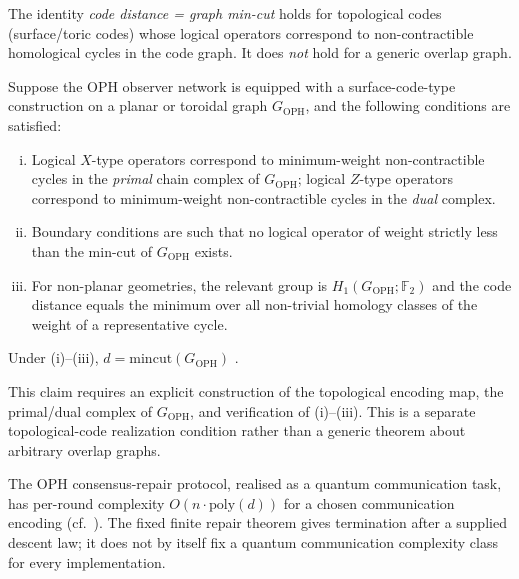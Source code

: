 \begin{claim}
\label{claim:qecc-mincut}
The identity \emph{code distance = graph min-cut} holds for topological
codes (surface/toric codes) whose logical operators correspond to
non-contractible homological cycles in the code graph.
It does \emph{not} hold for a generic overlap graph.

Suppose the OPH observer network is equipped with a surface-code-type
construction on a planar or toroidal graph $G_{\mathrm{OPH}}$, and the
following conditions are satisfied:
\begin{enumerate}[(i)]
  \item Logical $X$-type operators correspond to minimum-weight
        non-contractible cycles in the \emph{primal} chain complex of
        $G_{\mathrm{OPH}}$; logical $Z$-type operators correspond to
        minimum-weight non-contractible cycles in the \emph{dual} complex.
  \item Boundary conditions are such that no logical operator of weight
        strictly less than the min-cut of $G_{\mathrm{OPH}}$ exists.
  \item For non-planar geometries, the relevant group is
        $H_1(G_{\mathrm{OPH}};\mathbb{F}_2)$ and the code distance equals
        the minimum over all non-trivial homology classes of the weight of
        a representative cycle.
\end{enumerate}
Under (i)--(iii), $d=\mathrm{mincut}(G_{\mathrm{OPH}})$
\cite{Kitaev2003,Dennis2002}.

This claim requires an explicit construction of the topological encoding
map, the primal/dual complex of $G_{\mathrm{OPH}}$, and verification of
(i)--(iii). This is a separate topological-code realization condition rather than a
generic theorem about arbitrary overlap graphs.
\end{claim}

\begin{conjecture}
\label{conj:comm-complexity}
The \textrm{OPH} consensus-repair protocol, realised as a quantum
communication task, has per-round complexity $O(n\cdot\mathrm{poly}(d))$
for a chosen communication encoding (cf.~\cite{BCW98}). The fixed finite repair theorem gives
termination after a supplied descent law; it does not by itself fix a quantum communication
complexity class for every implementation.
\end{conjecture}

